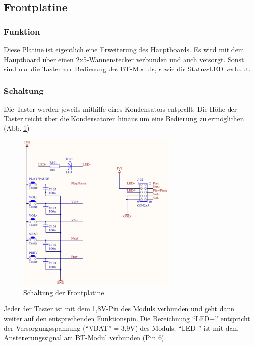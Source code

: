 \subsection{Frontplatine} \label{subsec:4.1.10}
\subsubsection{Funktion} \label{subsubsec:4.1.10.1}
Diese Platine ist eigentlich eine Erweiterung des Hauptboards. Es wird mit dem Hauptboard über einen 2x5-Wannenstecker verbunden und auch versorgt. Sonst sind nur die Taster zur Bedienung des BT-Moduls, sowie die Status-LED verbaut.

\subsubsection{Schaltung} \label{subsubsec:4.1.10.2}
Die Taster werden jeweils mithilfe eines Kondensators entprellt. Die Höhe der Taster reicht über die Kondensatoren hinaus um eine Bedienung zu ermöglichen. (Abb. \ref{fig:4.1.10.2.1})
\begin{figure} [H]
	\centering
	\includegraphics[width=0.7\textwidth]{img/BTModul/front_sch.png}
	\caption{Schaltung der Frontplatine}\label {fig:4.1.10.2.1}
\end{figure}
Jeder der Taster ist mit dem 1,8V-Pin des Moduls verbunden und geht dann weiter auf den entsprechenden Funktionspin. Die Bezeichnung \enquote{LED+} entspricht der Versorgungsspannung (\enquote{VBAT} = 3,9V) des Moduls. \enquote{LED-} ist mit dem Ansteuerungssignal am BT-Modul verbunden (Pin 6).

